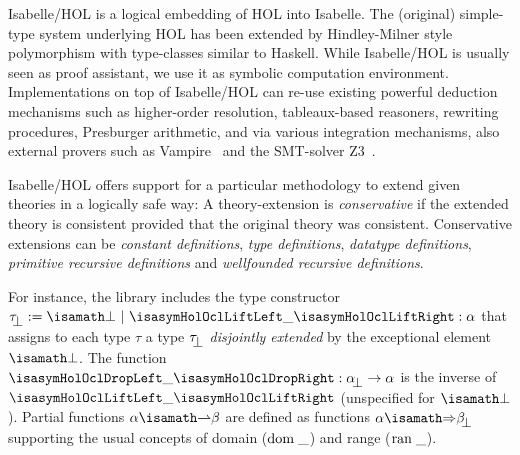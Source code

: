 Isabelle/HOL is a logical embedding of HOL into Isabelle.  The
(original) simple-type system underlying HOL has been extended by
Hindley-Milner style polymorphism with type-classes similar to
Haskell.  While Isabelle/HOL is usually seen as proof assistant, we
use it as symbolic computation environment. Implementations on top of
Isabelle/HOL can re-use existing powerful deduction mechanisms such as
higher-order resolution, tableaux-based reasoners, rewriting
procedures, Presburger arithmetic, and via various integration
mechanisms, also external provers such as
Vampire~\cite{riazanov.ea:vampire:1999} and the SMT-solver
Z3~\cite{moura.ea:z3:2008}.

Isabelle/HOL offers support for a particular methodology to extend
given theories in a logically safe way: A theory-extension is
\emph{conservative} if the extended theory is consistent provided that
the original theory was consistent.  Conservative extensions can be
\emph{constant definitions}, \emph{type definitions}, \emph{datatype
  definitions}, \emph{primitive recursive definitions} and
\emph{wellfounded recursive definitions}.

For instance, the library includes the type constructor $\up{\tau} :=
\isasymbottom ~ | ~ \lift{\_} : \alpha$ that assigns to each type
$\tau$ a type $\up{\tau}$ \emph{disjointly extended} by the
exceptional element $\isasymbottom$. The function $\drop{\_} :
\up{\alpha} \to \alpha$ is the inverse of $\lift{\_}$ (unspecified for
$\isasymbottom$). Partial functions $\alpha \isasymrightharpoonup
\beta$ are defined as functions $\alpha \isasymRightarrow \up{\beta}$
supporting the usual concepts of domain ($\mathrm{dom}\;\_$) and range
($\mathrm{ran}\;\_$).

